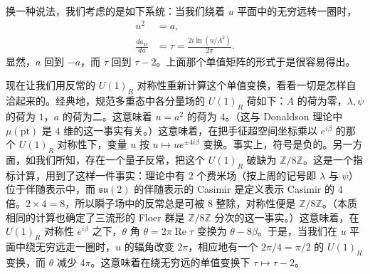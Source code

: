 换一种说法，我们考虑的是如下系统：当我们绕着 $u$ 平面中的无穷远转一圈时，
\begin{equation}
\tag{18.3}
\label{eq:18-3}
\begin{aligned}
u^2&=a,\\
\frac{da_D}{da}&=\tau=\frac{2i\ln(u/\Lambda^2)}{2\pi}.
\end{aligned}
\end{equation}
显然，$a$ 回到 $-a$，而 $\tau$ 回到 $\tau-2$。上面那个单值矩阵的形式于是很容易得出。



现在让我们用反常的 $U(1)_R$ 对称性重新计算这个单值变换，看看一切是怎样自洽起来的。经典地，规范多重态中各分量场的 $U(1)_R$ 荷如下：$A$ 的荷为零，$\lambda,\psi$ 的荷为 $1$，$a$ 的荷为二。这意味着 $u=a^2$ 的荷为 $4$。（这与 Donaldson 理论中 $\mu(\text{pt})$ 是 $4$ 维的这一事实有关。）这意味着，在把手征超空间坐标乘以 $e^{i\beta}$ 的那个 $U(1)_R$ 对称性下，变量 $u$ 按 $u\mapsto ue^{\pm4i\beta}$ 变换。事实上，符号是负的。另一方面，如我们所知，存在一个量子反常，把这个 $U(1)_R$ 破缺为 $\mathbb{Z}/8\mathbb{Z}$。这是一个指标计算，用到了这样一件事实：理论中有 $2$ 个费米场（按上周的记号即 $\lambda$ 与 $\psi$）位于伴随表示中，而 $\mathfrak{su}(2)$ 的伴随表示的 Casimir 是定义表示 Casimir 的 $4$ 倍。$2\times4=8$，所以瞬子场中的反常总是可被 $8$ 整除，对称性便是 $\mathbb{Z}/8\mathbb{Z}$。（本质相同的计算也确定了三流形的 Floer 群是 $\mathbb{Z}/8\mathbb{Z}$ 分次的这一事实。）这意味着，在 $U(1)_R$ 对称性 $e^{i\beta}$ 之下，$\theta$ 角 $\theta=2\pi\operatorname{Re}\tau$ 变换为 $\theta-8\beta$。于是，当我们在 $u$ 平面中绕无穷远走一圈时，$u$ 的辐角改变 $2\pi$，相应地有一个 $2\pi/4=\pi/2$ 的 $U(1)_R$ 变换，而 $\theta$ 减少 $4\pi$。这意味着在绕无穷远的单值变换下 $\tau\mapsto\tau-2$。

